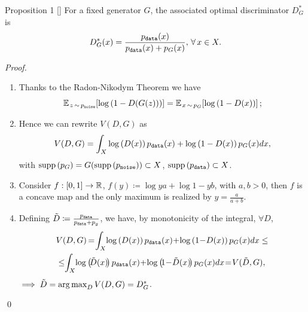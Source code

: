 \documentclass{beamer}
\begin{document}
	\begin{frame}
		\begin{block}{Proposition 1 \hfill [\citeauthor{goodfellow2014}]}
			For a fixed generator $G$, the associated optimal discriminator $D^*_G$ is
			\vspace{-0.3cm}
			\begin{equation*}
				D^*_G(x) = \frac{p_{\text{\texttt{data}}}(x)}{p_{\text{\texttt{data}}}(x) + p_G(x)}, \, \forall x \in X.
			\end{equation*}		
		\end{block}
		\textit{Proof.} 
		\begin{enumerate}
			\item 
				Thanks to the Radon-Nikodym Theorem we have 
				\vspace{-0.2cm}
				\begin{equation*}
					\mean[z \sim p_\text{\texttt{noise}}]{\log{1 - D(G(z))}} = \mean[x \sim p_G]{\log{1 - D(x)}};
				\end{equation*}
			\item 
				Hence we can rewrite $V(D, G)$ as
				\vspace{-0.3cm}
				\begin{equation*}
					V(D, G) = \int_X \log{D(x)} p_\text{\texttt{data}}(x) + \log{1 - D(x)} p_G(x) dx, 
				\end{equation*}
				\vskip -0.3cm
				with $\supp{p_G} = G(\supp{p_\text{\texttt{noise}}}) \subset X$, $\supp{p_\text{\texttt{data}}} \subset X$.
		\end{enumerate}
	\end{frame}

	\begin{frame}
		\begin{enumerate}\setcounter{enumi}{2}
			\item 
				Consider $f: [0, 1] \to \real$, $f(y) \coloneqq \log{y} a + \log{1 - y} b$, with $a, b > 0$, then $f$ is a concave map and the only maximum is realized by $y = \frac{a}{a + b}$.
			\item 
				Defining $\tilde{D} \coloneqq \frac{p_\text{\texttt{data}}}{p_\text{\texttt{data}} + p_g}$, we have, by monotonicity of the integral, $\forall D$,
				\vspace{-0.2cm}
				\begin{align*}
					& V(D, G) \kern-1pt = \kern-2pt \int_X \kern-2pt \log{D(x)} p_\text{\texttt{data}}(x) \kern-2pt + \kern-2pt \log{1 \kern-2pt - \kern-2pt D(x)} p_G(x) dx \leq \\
					& \leq \kern-3pt \int_X \kern-2pt \log{\kern-2pt \tilde{D}(x) \kern-2pt} p_\text{\texttt{data}}(x) \kern-2pt + \kern-2pt \log{\kern-2pt 1 \kern-2pt - \kern-2pt \tilde{D}(x) \kern-2pt} p_G(x) dx \kern-2pt = \kern-2pt V(\tilde{D}, G),
				\end{align*}
				$\implies \tilde{D} = \argmax_{D} V(D, G) = D^*_G$.
		\end{enumerate}
		\qed
	\end{frame}
\end{document}
